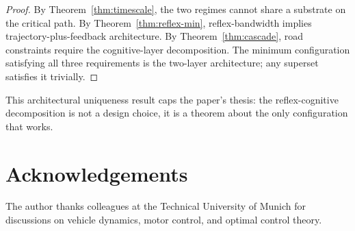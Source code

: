 \documentclass[11pt,twocolumn]{article}
\theoremstyle{definition}
\theoremstyle{remark}
\begin{document}
\begin{proof}
By Theorem~\ref{thm:timescale}, the two regimes cannot share a substrate on the critical path. By Theorem~\ref{thm:reflex-min}, reflex-bandwidth implies trajectory-plus-feedback architecture. By Theorem~\ref{thm:cascade}, road constraints require the cognitive-layer decomposition. The minimum configuration satisfying all three requirements is the two-layer architecture; any superset satisfies it trivially.
\end{proof}

This architectural uniqueness result caps the paper's thesis: the reflex-cognitive decomposition is not a design choice, it is a theorem about the only configuration that works.

\section*{Acknowledgements}

The author thanks colleagues at the Technical University of Munich for discussions on vehicle dynamics, motor control, and optimal control theory.



\end{document}
